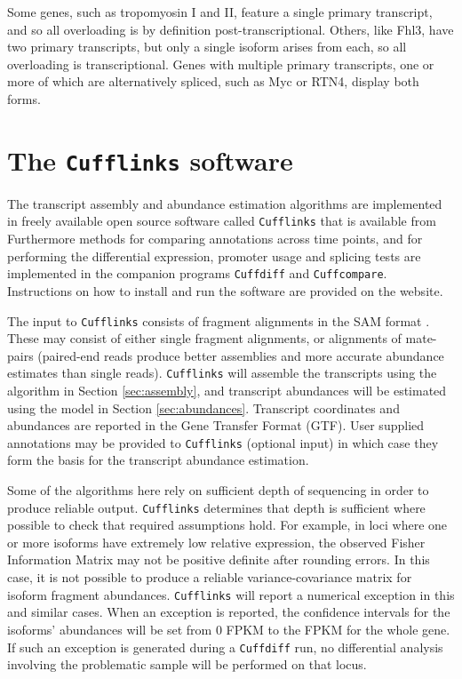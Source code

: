 \documentclass[12pt]{amsart}
\theoremstyle{definition}
\begin{document}
Some genes, such as tropomyosin I and II, feature a single primary
transcript, and so all overloading is by definition post-transcriptional.
Others, like Fhl3, have two primary transcripts, but only a single isoform
arises from each, so all overloading is transcriptional. Genes with multiple
primary transcripts, one or more of which are alternatively spliced, such as
Myc or RTN4, display both forms.


\section{The {\tt Cufflinks} software}

The transcript assembly and abundance estimation algorithms are implemented in
freely available open source software called {\tt Cufflinks} that is available
from  \newline Furthermore
methods for comparing annotations across time points, and for performing the
differential expression, promoter usage and splicing tests are implemented in
the companion programs {\tt Cuffdiff} and {\tt Cuffcompare}. Instructions on
how to install and run the software are provided on the website.

The input to {\tt Cufflinks} consists of fragment alignments in the SAM format
\cite{Li2009a}. These may consist of either single fragment alignments, or alignments of mate-pairs (paired-end reads produce better assemblies and more accurate abundance estimates than single reads). {\tt Cufflinks} will assemble the transcripts using the
algorithm in Section \ref{sec:assembly}, and transcript abundances will be
estimated using the model in Section \ref{sec:abundances}. Transcript
coordinates and abundances are reported in the Gene Transfer Format (GTF).
User supplied annotations may be provided to {\tt Cufflinks} (optional input) in
which case they form the basis for the transcript abundance estimation.

Some of the algorithms here rely on sufficient depth of sequencing in order to
produce reliable output. {\tt Cufflinks} determines that depth is sufficient where
possible to check that required assumptions hold. For example, in loci where one
or more isoforms have extremely low relative expression, the observed Fisher
Information Matrix may not be positive definite after rounding errors. In this
case, it is not possible to produce a reliable variance-covariance matrix for
isoform fragment abundances. {\tt Cufflinks} will report a numerical
exception in this and similar cases. When an exception is reported, the
confidence intervals for the isoforms' abundances will be set from 0
FPKM to the FPKM for the whole gene. If such an exception is generated during
a {\tt Cuffdiff} run, no differential analysis involving the problematic
sample will be performed on that locus. 
\newpage 
\end{document}

